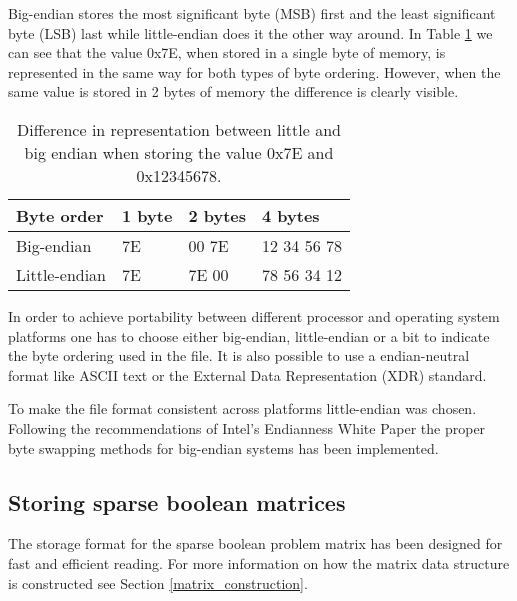 Big-endian stores the most significant byte (MSB) first and the least significant byte (LSB) last while little-endian does it the other way around.
In Table \ref{tab:endian} we can see that the value 0x7E, when stored in a single byte of memory, is represented in the same way for both types of byte ordering.
However, when the same value is stored in 2 bytes of memory the difference is clearly visible.


\begin{table}[htbp]
	\centering
	\begin{tabular}{|l||l|l||l|}
		\hline
		\bf Byte order & \bf 1 byte & \bf 2 bytes & \bf 4 bytes \\ \hline
		Big-endian    & 7E & 00 7E & 12 34 56 78 \\ \hline
		Little-endian & 7E & 7E 00 & 78 56 34 12 \\ \hline
	\end{tabular}
	\caption{Difference in representation between little and big endian when storing the value 0x7E and 0x12345678.}
	\label{tab:endian}
\end{table}

In order to achieve portability between different processor and operating system platforms one has to choose either big-endian, little-endian or a bit to indicate the byte ordering used in the file.
It is also possible to use a endian-neutral format like ASCII text or the External Data Representation (XDR) \cite{RFC4506} standard.

To make the file format consistent across platforms little-endian was chosen.
Following the recommendations of Intel's Endianness White Paper \cite{intel-endian} the proper byte swapping methods for big-endian systems has been implemented.




\subsection{Storing sparse boolean matrices}

The storage format for the sparse boolean problem matrix has been designed for fast and efficient reading.
For more information on how the matrix data structure is constructed see Section \vref{matrix_construction}.



